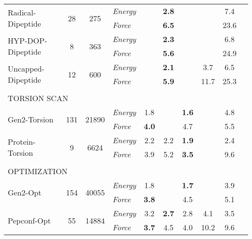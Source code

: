 \documentclass[varwidth]{standalone}
\newcommand{\widthbetweentype}{7pt}
\begin{document}
\begin{adjustbox}{width=\textwidth,center}
\begin{tabular}{l c c l c c c c c c}
\hline
\multirow{2}{*}{Radical-Dipeptide} & \multirow{2}{*}{28} & \multirow{2}{*}{275} & \textit{Energy} &  & \textbf{2.8} &  &  & 7.4\\
                                   &                       &                         & \textit{Force}  &  & \textbf{6.5} &  &  & 23.6\\
\hline
\multirow{2}{*}{HYP-DOP-Dipeptide} & \multirow{2}{*}{8} & \multirow{2}{*}{363} & \textit{Energy} &  & \textbf{2.3} &  &  & 6.8\\
                                   &                       &                         & \textit{Force}  &  & \textbf{5.6} &  &  & 24.9\\
\hline
\multirow{2}{*}{Uncapped-Dipeptide} & \multirow{2}{*}{12} & \multirow{2}{*}{600} & \textit{Energy} &  & \textbf{2.1} &  & 3.7 & 6.5\\
                                   &                       &                         & \textit{Force}  &  & \textbf{5.9} &  & 11.7 & 25.3\\
\hline
\multicolumn{8}{l}{\vspace{\widthbetweentype}} \\[-1em]
\multicolumn{8}{l}{\small{TORSION SCAN}} \\\hline
\multirow{2}{*}{Gen2-Torsion} & \multirow{2}{*}{131} & \multirow{2}{*}{21890} & \textit{Energy} & 1.8 &  & \textbf{1.6} &  & 4.8\\
                                   &                       &                         & \textit{Force}  & \textbf{4.0} &  & 4.7 &  & 5.5\\
\hline
\multirow{2}{*}{Protein-Torsion} & \multirow{2}{*}{9} & \multirow{2}{*}{6624} & \textit{Energy} & 2.2 & 2.2 & \textbf{1.9} &  & 2.4\\
                                   &                       &                         & \textit{Force}  & 3.9 & 5.2 & \textbf{3.5} &  & 9.6\\
\hline
\multicolumn{8}{l}{\vspace{\widthbetweentype}} \\[-1em]
\multicolumn{8}{l}{\small{OPTIMIZATION}} \\\hline
\multirow{2}{*}{Gen2-Opt} & \multirow{2}{*}{154} & \multirow{2}{*}{40055} & \textit{Energy} & 1.8 &  & \textbf{1.7} &  & 3.9\\
                                   &                       &                         & \textit{Force}  & \textbf{3.8} &  & 4.5 &  & 5.1\\
\hline
\multirow{2}{*}{Pepconf-Opt} & \multirow{2}{*}{55} & \multirow{2}{*}{14884} & \textit{Energy} & 3.2 & \textbf{2.7} & 2.8 & 4.1 & 3.5\\
                                   &                       &                         & \textit{Force}  & \textbf{3.7} & 4.5 & 4.0 & 10.2 & 9.6\\
\hline
\hline
\hline
\end{tabular}

\end{adjustbox}
\end{document}

